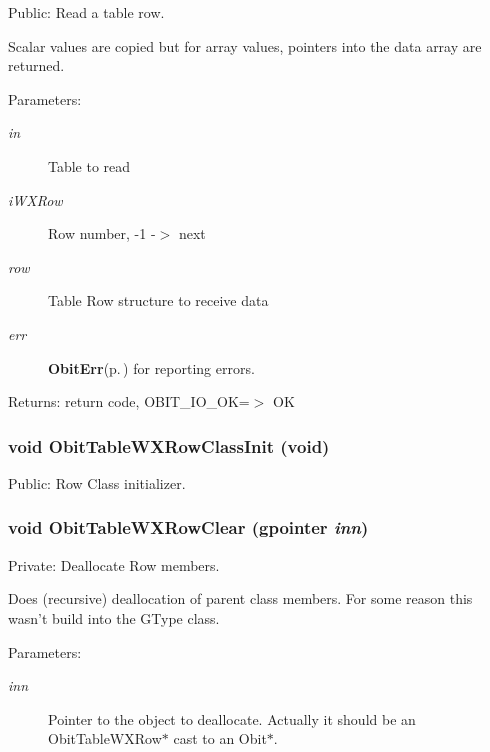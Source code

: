 Public: Read a table row. 

Scalar values are copied but for array values, pointers into the data array are returned. \begin{Desc}
\item[Parameters:]
\begin{description}
\item[{\em in}]Table to read \item[{\em i\-WXRow}]Row number, -1 -$>$ next \item[{\em row}]Table Row structure to receive data \item[{\em err}]{\bf Obit\-Err}{\rm (p.\,\pageref{structObitErr})} for reporting errors. \end{description}
\end{Desc}
\begin{Desc}
\item[Returns:]return code, OBIT\_\-IO\_\-OK=$>$ OK \end{Desc}
\subsubsection{\setlength{\rightskip}{0pt plus 5cm}void Obit\-Table\-WXRow\-Class\-Init (void)}\label{ObitTableWX_8c_a26}


Public: Row Class initializer. 

\subsubsection{\setlength{\rightskip}{0pt plus 5cm}void Obit\-Table\-WXRow\-Clear (gpointer {\em inn})}\label{ObitTableWX_8c_a7}


Private: Deallocate Row members. 

Does (recursive) deallocation of parent class members. For some reason this wasn't build into the GType class. \begin{Desc}
\item[Parameters:]
\begin{description}
\item[{\em inn}]Pointer to the object to deallocate. Actually it should be an Obit\-Table\-WXRow$\ast$ cast to an Obit$\ast$. \end{description}
\end{Desc}
